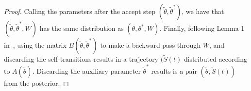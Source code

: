 \begin{proof}
Calling the parameters 
after the accept step $(\tilde{\theta}, \tilde{\theta}^*)$, we have that
$(\tilde{\theta}, \tilde{\theta}^*,W)$ has the same distribution as
$(\theta, \theta^*,W)$.
Finally, following Lemma 1 in~\cite{RaoTeh13}, using the matrix 
$B(\tilde{\theta},\tilde{\theta}^*)$ to make a backward pass through $W$,
and discarding the self-transitions results in a trajectory $(\tilde{S}(t)$
distributed according to $A(\tilde{\theta})$. Discarding the auxiliary parameter
$\tilde{\theta}^*$ results is a pair $(\tilde{\theta},\tilde{S}(t))$ from
the posterior.
\end{proof}

